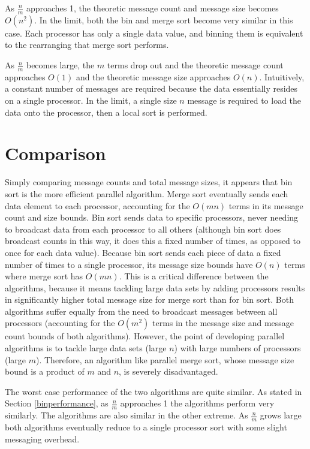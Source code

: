 \documentclass[10pt]{article}
\begin{document}
As \(\frac{n}{m}\) approaches 1, the theoretic message count and message size becomes \(O(n^2)\). In the limit, both the bin and merge sort become very similar in this case. Each processor has only a single data value, and binning them is equivalent to the rearranging that merge sort performs.

As \(\frac{n}{m}\) becomes large, the \(m\) terms drop out and the theoretic message count approaches \(O(1)\) and the theoretic message size approaches \(O(n)\). Intuitively, a constant number of messages are required because the data essentially resides on a single processor. In the limit, a single size \(n\) message is required to load the data onto the processor, then a local sort is performed.

\section{Comparison}
Simply comparing message counts and total message sizes, it appears that bin sort is the more efficient parallel algorithm. Merge sort eventually sends each data element to each processor, accounting for the \(O(mn)\) terms in its message count and size bounds. Bin sort sends data to specific processors, never needing to broadcast data from each processor to all others (although bin sort does broadcast counts in this way, it does this a fixed number of times, as opposed to once for each data value). Because bin sort sends each piece of data a fixed number of times to a single processor, its message size bounds have \(O(n)\) terms where merge sort has \(O(mn)\). This is a critical difference between the algorithms, because it means tackling large data sets by adding processors results in significantly higher total message size for merge sort than for bin sort. Both algorithms suffer equally from the need to broadcast messages between all processors (accounting for the \(O(m^2)\) terms in the message size and message count bounds of both algorithms). However, the point of developing parallel algorithms is to tackle large data sets (large \(n\)) with large numbers of processors (large \(m\)). Therefore, an algorithm like parallel merge sort, whose message size bound is a product of \(m\) and \(n\), is severely disadvantaged.

The worst case performance of the two algorithms are quite similar. As stated in Section \ref{binperformance}, as \(\frac{n}{m}\) approaches 1 the algorithms perform very similarly. The algorithms are also similar in the other extreme. As \(\frac{n}{m}\) grows large both algorithms eventually reduce to a single processor sort with some slight messaging overhead.
\end{document}
